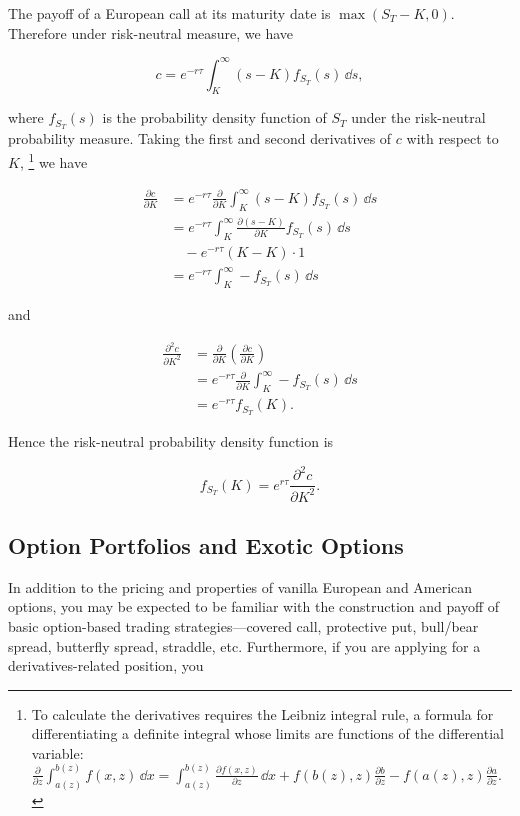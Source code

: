 \begin{solution}
The payoff of a European call at its maturity date is $\max(S_T-K,0)$.
Therefore under risk-neutral measure, we have

\[
c=e^{-r\tau}\int_K^\infty(s-K)f_{S_T}(s)\,\dd s,
\]

where $f_{S_T}(s)$ is the probability density function of $S_T$ under the risk-neutral
probability measure. Taking the first and second derivatives of $c$ with respect to $K$,
\footnote[10]{To calculate the derivatives requires the Leibniz integral rule, a formula for differentiating a definite integral whose limits are functions of the differential variable:
\(\displaystyle \frac{\partial}{\partial z}\int_{a(z)}^{b(z)}f(x,z)\,\dd x
=\int_{a(z)}^{b(z)}\frac{\partial f(x,z)}{\partial z}\,\dd x
+f(b(z),z)\frac{\partial b}{\partial z}-f(a(z),z)\frac{\partial a}{\partial z}.\)} we have

\[
\begin{aligned}
\frac{\partial c}{\partial K}
&=e^{-r\tau}\frac{\partial}{\partial K}\int_K^\infty(s-K)f_{S_T}(s)\,\dd s\\
&=e^{-r\tau}\int_K^\infty\frac{\partial(s-K)}{\partial K}f_{S_T}(s)\,\dd s\\
&\quad-e^{-r\tau}(K-K)\cdot1\\
&=e^{-r\tau}\int_K^\infty-f_{S_T}(s)\,\dd s
\end{aligned}
\]

and

\[
\begin{aligned}
\frac{\partial^2c}{\partial K^2}
&=\frac{\partial}{\partial K}\left(\frac{\partial c}{\partial K}\right)\\
&=e^{-r\tau}\frac{\partial}{\partial K}\int_K^\infty-f_{S_T}(s)\,\dd s\\
&=e^{-r\tau}f_{S_T}(K).
\end{aligned}
\]

Hence the risk-neutral probability density function is

\[
f_{S_T}(K)=e^{r\tau}\frac{\partial^2c}{\partial K^2}.
\]

\end{solution}

\subsection{Option Portfolios and Exotic Options}

In addition to the pricing and properties of vanilla European and American options, you
may be expected to be familiar with the construction and payoff of basic option-based
trading strategies---covered call, protective put, bull/bear spread, butterfly spread,
straddle, etc. Furthermore, if you are applying for a derivatives-related position, you

